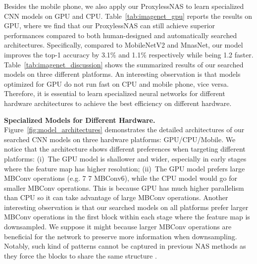 \documentclass{article} \usepackage{iclr2019_conference,times}
\newcommand{\minisection}[1]{\vspace{5pt}\noindent\textbf{#1.}}
\begin{document}
Besides the mobile phone, we also apply our ProxylessNAS to learn specialized CNN models on GPU and CPU. Table~\ref{tab:imagenet_gpu} reports the results on GPU, where we find that our ProxylessNAS can still achieve superior performances compared to both human-designed and automatically searched architectures. Specifically, compared to MobileNetV2 and MnasNet, our model improves the top-1 accuracy by 3.1\% and 1.1\% respectively while being 1.2 faster. Table~\ref{tab:imagenet_discussion} shows the summarized results of our searched models on three different platforms. An interesting observation is that models optimized for GPU do not run fast on CPU and mobile phone, vice versa. Therefore, it is essential to learn specialized neural networks for different hardware architectures to achieve the best efficiency on different hardware.

\minisection{Specialized Models for Different Hardware} Figure~\ref{fig:model_architectures} demonstrates the detailed architectures of our searched CNN models on three hardware platforms: GPU/CPU/Mobile. We notice that the architecture shows different preferences when targeting different platforms:  (i)~The GPU model is shallower and wider, especially in early stages where the feature map has higher resolution; (ii)~The GPU model prefers large MBConv operations (e.g. 7  7 MBConv6), while the CPU model would go for smaller MBConv operations. This is because GPU has much higher parallelism than CPU so it can take advantage of large MBConv operations. Another interesting observation is that our searched models on all platforms prefer larger MBConv operations in the first block within each stage where the feature map is downsampled. We suppose it might because larger MBConv operations are beneficial for the network to preserve more information when downsampling. Notably, such kind of patterns cannot be captured in previous NAS methods as they force the blocks to share the same structure \citep{zoph2017learning,liu2017progressive}. 
\end{document}
